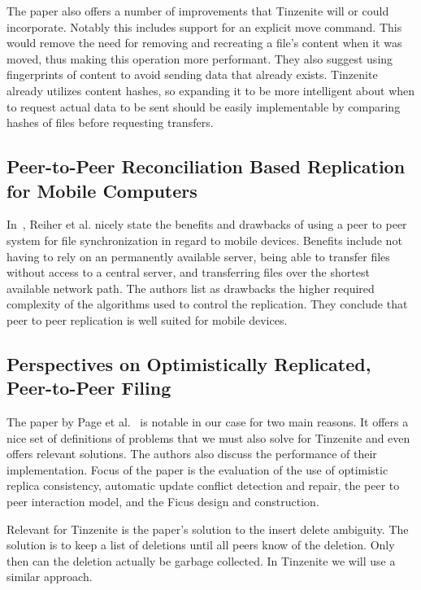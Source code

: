 The paper also offers a number of improvements that Tinzenite will or could incorporate.
Notably this includes support for an explicit move command.
This would remove the need for removing and recreating a file's content when it was moved, thus making this operation more performant.%
They also suggest using fingerprints of content to avoid sending data that already exists.
Tinzenite already utilizes content hashes, so expanding it to be more intelligent about when to request actual data to be sent should be easily implementable by comparing hashes of files before requesting transfers.

\subsection{Peer-to-Peer Reconciliation Based Replication for Mobile Computers}
\label{sub:Peer-to-Peer Reconciliation Based Replication for Mobile Computers}

In~\cite{reiher1996peer}, Reiher et al. nicely state the benefits and drawbacks of using a peer to peer system for file synchronization in regard to mobile devices.
Benefits include not having to rely on an permanently available server, being able to transfer files without access to a central server, and transferring files over the shortest available network path.
The authors list as drawbacks the higher required complexity of the algorithms used to control the replication.
They conclude that peer to peer replication is well suited for mobile devices.

\subsection{Perspectives on Optimistically Replicated, Peer-to-Peer Filing}
\label{sub:Perspectives on Optimistically Replicated, Peer-to-Peer Filing}

The paper by Page et al.~\cite{page1998perspectives} is notable in our case for two main reasons.
It offers a nice set of definitions of problems that we must also solve for Tinzenite and even offers relevant solutions.
The authors also discuss the performance of their implementation.
Focus of the paper is the evaluation of the use of optimistic replica consistency, automatic update conflict detection and repair, the peer to peer interaction model, and the Ficus design and construction.

Relevant for Tinzenite is the paper's solution to the insert delete ambiguity.
The solution is to keep a list of deletions until all peers know of the deletion.
Only then can the deletion actually be garbage collected.
In Tinzenite we will use a similar approach.

